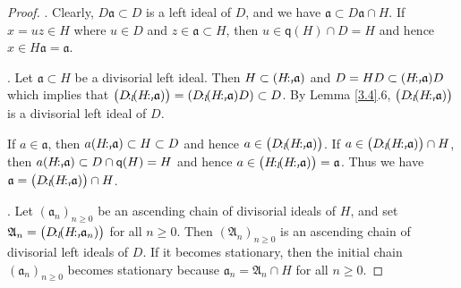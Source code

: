 \documentclass[a4paper]{amsart}
\theoremstyle{definition}
\numberwithin{equation}{section}
\begin{document}
\begin{proof}

. Clearly, $D \mathfrak a \subset D$ is a left ideal of $D$, and we
have $\mathfrak a \subset D \mathfrak a \cap H$. If $x = uz \in H$
where $u \in D$ and $z \in \mathfrak a \subset H$, then $u \in
\mathsf q (H) \cap D = H$ and hence $x \in H \mathfrak a = \mathfrak
a$.

. Let $\mathfrak a \subset H$ be a divisorial left ideal. Then $H
\subset (H {\negthinspace :_r \negthinspace} \mathfrak a)$ and $D = HD \subset (H {\negthinspace :_r \negthinspace} \mathfrak
a)D$ which implies that $\big(D {\negthinspace :_l \negthinspace} (H {\negthinspace :_r \negthinspace} \mathfrak a)\big) = (D
{\negthinspace :_l \negthinspace} (H {\negthinspace :_r \negthinspace} \mathfrak a)D ) \subset D$. By Lemma \ref{3.4}.6,
$\big(D {\negthinspace :_l \negthinspace} (H {\negthinspace :_r \negthinspace} \mathfrak a)\big)$ is a divisorial left ideal
of $D$.

If $a \in \mathfrak a$, then $a(H {\negthinspace :_r \negthinspace} \mathfrak a) \subset H
\subset D$ and hence $a \in \big(D {\negthinspace :_l \negthinspace} (H {\negthinspace :_r \negthinspace} \mathfrak a)\big)$.
If $a \in \big(D {\negthinspace :_l \negthinspace} (H {\negthinspace :_r \negthinspace} \mathfrak a) \big) \cap H$, then $a (H
{\negthinspace :_r \negthinspace} \mathfrak a) \subset D \cap \mathsf q (H) = H$ and hence $a \in
\big(H {\negthinspace :_l \negthinspace} (H {\negthinspace :_r \negthinspace} \mathfrak a)\big) = \mathfrak a$. Thus we have
$\mathfrak a = \big(D {\negthinspace :_l \negthinspace} (H {\negthinspace :_r \negthinspace} \mathfrak a)\big) \cap H$.

. Let $(\mathfrak a_n)_{n \ge 0}$ be an ascending chain of
divisorial ideals of $H$, and set $\mathfrak A_n = \big(D {\negthinspace :_l \negthinspace} (H
{\negthinspace :_r \negthinspace} \mathfrak a_n)\big)$ for all $n \ge 0$. Then $(\mathfrak
A_n)_{n \ge 0}$ is an ascending chain of divisorial left ideals of
$D$. If it becomes stationary, then the initial chain $(\mathfrak
a_n)_{n \ge 0}$ becomes stationary because $\mathfrak a_n =
\mathfrak A_n \cap H$ for all $n \ge 0$.
\end{proof}
\end{document}
